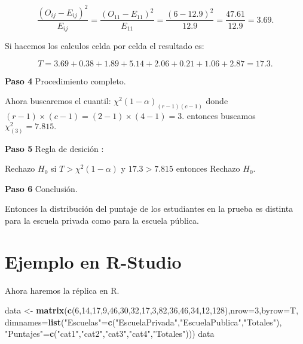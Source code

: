 \documentclass[
  a4paper,
  oneside,
  openany]{book}
\newenvironment{Shaded}{\begin{snugshade}}{\end{snugshade}}
\newcommand{\AttributeTok}[1]{\textcolor[rgb]{0.13,0.29,0.53}{#1}}
\newcommand{\DecValTok}[1]{\textcolor[rgb]{0.00,0.00,0.81}{#1}}
\newcommand{\FunctionTok}[1]{\textcolor[rgb]{0.13,0.29,0.53}{\textbf{#1}}}
\newcommand{\NormalTok}[1]{#1}
\newcommand{\OtherTok}[1]{\textcolor[rgb]{0.56,0.35,0.01}{#1}}
\newcommand{\StringTok}[1]{\textcolor[rgb]{0.31,0.60,0.02}{#1}}
\begin{document}
\[\frac{(O_{ij}-E_{ij})^2}{E_{ij}}= \frac{(O_{11}-E_{11})^2}{E_{11}}=\frac{(6-12.9)^2}{12.9}=\frac{47.61}{12.9}=3.69.\]

Si hacemos los calculos celda por celda el resultado es:

\[T=3.69+0.38+1.89+5.14+2.06+0.21+1.06+2.87=17.3.\]

\textbf{Paso 4} Procedimiento completo.

Ahora buscaremos el cuantil: \(\chi^2(1-\alpha)_{(r-1)(c-1)}\) donde \((r-1)\times(c-1)=(2-1)\times(4-1)=3.\)
entonces buscamos \(\chi^2_{(3)}=7.815.\)

\textbf{Paso 5} Regla de desición :

Rechazo \(H_0\) si \(T> \chi^2(1-\alpha)\) y \(17.3> 7.815\) entonces Rechazo \(H_0\).

\textbf{Paso 6} Conclusión.

Entonces la distribución del puntaje de los estudiantes en la prueba es distinta para la escuela privada como para la escuela pública.

\hypertarget{ejemplo-en-r-studio-11}{%
\section{Ejemplo en R-Studio}\label{ejemplo-en-r-studio-11}}

Ahora haremos la réplica en R.

\begin{Shaded}
\begin{Highlighting}[]
\NormalTok{data }\OtherTok{\textless{}{-}} \FunctionTok{matrix}\NormalTok{(}\FunctionTok{c}\NormalTok{(}\DecValTok{6}\NormalTok{,}\DecValTok{14}\NormalTok{,}\DecValTok{17}\NormalTok{,}\DecValTok{9}\NormalTok{,}\DecValTok{46}\NormalTok{,}\DecValTok{30}\NormalTok{,}\DecValTok{32}\NormalTok{,}\DecValTok{17}\NormalTok{,}\DecValTok{3}\NormalTok{,}\DecValTok{82}\NormalTok{,}\DecValTok{36}\NormalTok{,}\DecValTok{46}\NormalTok{,}\DecValTok{34}\NormalTok{,}\DecValTok{12}\NormalTok{,}\DecValTok{128}\NormalTok{),}\AttributeTok{nrow=}\DecValTok{3}\NormalTok{,}\AttributeTok{byrow=}\NormalTok{T, }
               \AttributeTok{dimnames=}\FunctionTok{list}\NormalTok{(}\StringTok{"Escuelas"}\OtherTok{=}\FunctionTok{c}\NormalTok{(}\StringTok{"EscuelaPrivada"}\NormalTok{,}\StringTok{"EscuelaPublica"}\NormalTok{,}\StringTok{"Totales"}\NormalTok{), }
                             \StringTok{"Puntajes"}\OtherTok{=}\FunctionTok{c}\NormalTok{(}\StringTok{"cat1"}\NormalTok{,}\StringTok{"cat2"}\NormalTok{,}\StringTok{"cat3"}\NormalTok{,}\StringTok{"cat4"}\NormalTok{,}\StringTok{"Totales"}\NormalTok{)))}
\NormalTok{data}
\end{Highlighting}
\end{Shaded}
\end{document}
